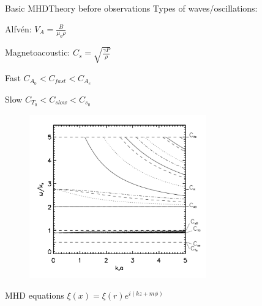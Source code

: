 \documentclass[table]{beamer}
\begin{document}
\begin{frame}{Basic MHD}{Theory before observations}
    Types of waves/oscillations:
    \begin{itemize*}
        \item Alfv\'en: $V_A = \frac{B}{\mu_0\rho}$
        \item Magnetoacoustic: $C_s = \sqrt{\frac{\gamma P}{\rho}}$
            \begin{itemize*}
                \item Fast $C_{A_0} < C_{fast} < C_{A_e} $
                \item Slow $C_{T_0} < C_{slow} < C_{s_0} $
            \end{itemize*}
    \end{itemize*}
\end{frame}%

\begin{frame}
    \begin{figure}
        \includegraphics[width=3in]{disp_diagram.png}
    \end{figure}
\end{frame}%

\begin{frame}{MHD equations}
$ \xi(x) = \xi(r)e^{i(kz+m\phi)}  $
\end{frame}%
\end{document}
